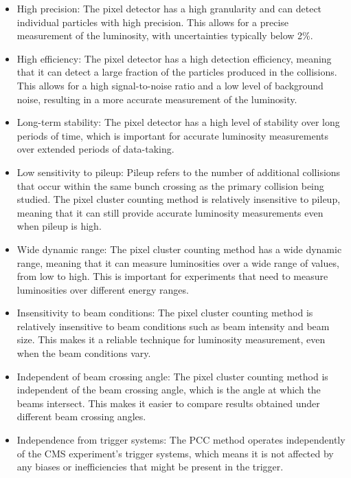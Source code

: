 \begin{itemize}

\item High precision: The pixel detector has a high granularity and can detect individual particles with high precision. This allows for a precise measurement of the luminosity, with uncertainties typically below 2\%.

\item High efficiency: The pixel detector has a high detection efficiency, meaning that it can detect a large fraction of the particles produced in the collisions. This allows for a high signal-to-noise ratio and a low level of background noise, resulting in a more accurate measurement of the luminosity.

\item Long-term stability: The pixel detector has a high level of stability over long periods of time, which is important for accurate luminosity measurements over extended periods of data-taking.


\item Low sensitivity to pileup: Pileup refers to the number of additional collisions that occur within the same bunch crossing as the primary collision being studied. The pixel cluster counting method is relatively insensitive to pileup, meaning that it can still provide accurate luminosity measurements even when pileup is high.

\item Wide dynamic range: The pixel cluster counting method has a wide dynamic range, meaning that it can measure luminosities over a wide range of values, from low to high. This is important for experiments that need to measure luminosities over different energy ranges.

\item Insensitivity to beam conditions: The pixel cluster counting method is relatively insensitive to beam conditions such as beam intensity and beam size. This makes it a reliable technique for luminosity measurement, even when the beam conditions vary.

\item Independent of beam crossing angle: The pixel cluster counting method is independent of the beam crossing angle, which is the angle at which the beams intersect. This makes it easier to compare results obtained under different beam crossing angles.


\item Independence from trigger systems: The PCC method operates independently of the CMS experiment's trigger systems, which means it is not affected by any biases or inefficiencies that might be present in the trigger.

\end{itemize}

